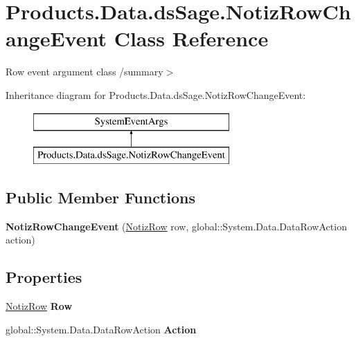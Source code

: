 \hypertarget{class_products_1_1_data_1_1ds_sage_1_1_notiz_row_change_event}{}\section{Products.\+Data.\+ds\+Sage.\+Notiz\+Row\+Change\+Event Class Reference}
\label{class_products_1_1_data_1_1ds_sage_1_1_notiz_row_change_event}


Row event argument class /summary$>$  


Inheritance diagram for Products.\+Data.\+ds\+Sage.\+Notiz\+Row\+Change\+Event\+:\begin{figure}[H]
\begin{center}
\leavevmode
\includegraphics[height=2.000000cm]{class_products_1_1_data_1_1ds_sage_1_1_notiz_row_change_event}
\end{center}
\end{figure}
\subsection*{Public Member Functions}
\begin{DoxyCompactItemize}
\item 
{\bfseries Notiz\+Row\+Change\+Event} (\hyperlink{class_products_1_1_data_1_1ds_sage_1_1_notiz_row}{Notiz\+Row} row, global\+::\+System.\+Data.\+Data\+Row\+Action action)\hypertarget{class_products_1_1_data_1_1ds_sage_1_1_notiz_row_change_event_a21f835d8aeac20a597833c86564d4be8}{}\label{class_products_1_1_data_1_1ds_sage_1_1_notiz_row_change_event_a21f835d8aeac20a597833c86564d4be8}

\end{DoxyCompactItemize}
\subsection*{Properties}
\begin{DoxyCompactItemize}
\item 
\hyperlink{class_products_1_1_data_1_1ds_sage_1_1_notiz_row}{Notiz\+Row} {\bfseries Row}\hypertarget{class_products_1_1_data_1_1ds_sage_1_1_notiz_row_change_event_aae695f35936863a5a39d1047b919a6c5}{}\label{class_products_1_1_data_1_1ds_sage_1_1_notiz_row_change_event_aae695f35936863a5a39d1047b919a6c5}

\item 
global\+::\+System.\+Data.\+Data\+Row\+Action {\bfseries Action}\hypertarget{class_products_1_1_data_1_1ds_sage_1_1_notiz_row_change_event_a99a08f122119651438c899556dbd8903}{}\label{class_products_1_1_data_1_1ds_sage_1_1_notiz_row_change_event_a99a08f122119651438c899556dbd8903}

\end{DoxyCompactItemize}


